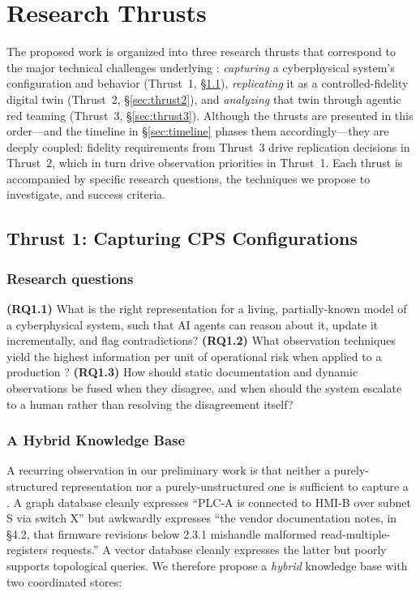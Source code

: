 \section{Research Thrusts}
\label{sec:thrusts}

The proposed work is organized into three research thrusts that
correspond to the major technical challenges underlying \sysname:
\emph{capturing} a cyberphysical system's configuration and behavior
(Thrust~1, \S\ref{sec:thrust1}), \emph{replicating} it as a
controlled-fidelity digital twin (Thrust~2, \S\ref{sec:thrust2}), and
\emph{analyzing} that twin through agentic red teaming
(Thrust~3, \S\ref{sec:thrust3}). Although the thrusts are presented in
this order---and the timeline in \S\ref{sec:timeline} phases them
accordingly---they are deeply coupled: fidelity requirements from
Thrust~3 drive replication decisions in Thrust~2, which in turn drive
observation priorities in Thrust~1. Each thrust is accompanied by
specific research questions, the techniques we propose to investigate,
and success criteria.

\subsection{Thrust 1: Capturing CPS Configurations}
\label{sec:thrust1}

\subsubsection*{Research questions}
\textbf{(RQ1.1)} What is the right representation for a living,
partially-known model of a cyberphysical system, such that AI agents
can reason about it, update it incrementally, and flag contradictions?
\textbf{(RQ1.2)} What observation techniques yield the highest
information per unit of operational risk when applied to a production
\cps?
\textbf{(RQ1.3)} How should static documentation and dynamic
observations be fused when they disagree, and when should the system
escalate to a human rather than resolving the disagreement itself?

\subsubsection{A Hybrid Knowledge Base}

A recurring observation in our preliminary work is that neither a
purely-structured representation nor a purely-unstructured one is
sufficient to capture a \cps.  A graph database cleanly expresses
``PLC-A is connected to HMI-B over subnet S via switch X'' but
awkwardly expresses ``the vendor documentation notes, in §4.2, that
firmware revisions below 2.3.1 mishandle malformed read-multiple-registers
requests.''  A vector database cleanly expresses the latter but
poorly supports topological queries.  We therefore propose a
\emph{hybrid} knowledge base with two coordinated stores:

